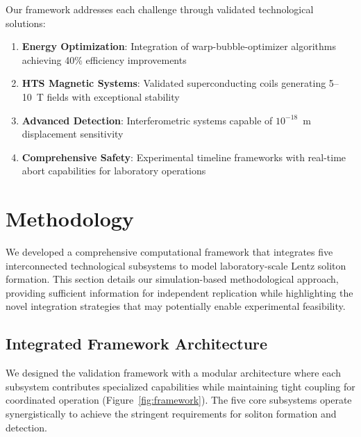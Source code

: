 \documentclass[12pt,a4paper]{article}
\begin{document}
Our framework addresses each challenge through validated technological solutions:
\begin{enumerate}
\item \textbf{Energy Optimization}: Integration of warp-bubble-optimizer algorithms achieving 40\% efficiency improvements
\item \textbf{HTS Magnetic Systems}: Validated superconducting coils generating 5--10~T fields with exceptional stability
\item \textbf{Advanced Detection}: Interferometric systems capable of $10^{-18}$~m displacement sensitivity
\item \textbf{Comprehensive Safety}: Experimental timeline frameworks with real-time abort capabilities for laboratory operations
\end{enumerate}

\section{Methodology}

We developed a comprehensive computational framework that integrates five interconnected technological subsystems to model laboratory-scale Lentz soliton formation. This section details our simulation-based methodological approach, providing sufficient information for independent replication while highlighting the novel integration strategies that may potentially enable experimental feasibility.

\subsection{Integrated Framework Architecture}

We designed the validation framework with a modular architecture where each subsystem contributes specialized capabilities while maintaining tight coupling for coordinated operation (Figure~\ref{fig:framework}). The five core subsystems operate synergistically to achieve the stringent requirements for soliton formation and detection.
\end{document}
